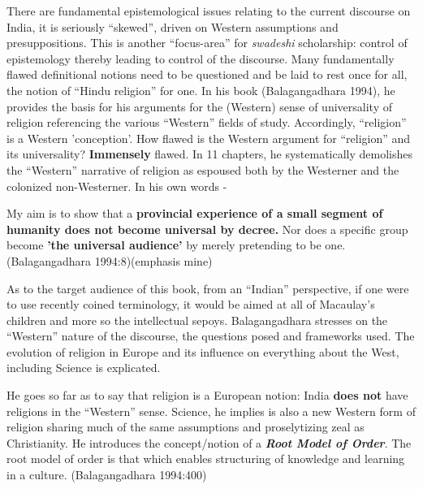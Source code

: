 There are fundamental epistemological issues relating to the current discourse on India, it is seriously “skewed”, driven on Western assumptions and presuppositions. This is another “focus-area” for \textit{swadeshi} scholarship: control of epistemology thereby leading to control of the discourse. Many fundamentally flawed definitional notions need to be questioned and be laid to rest once for all, the notion of “Hindu religion” for one. In his book (Balagangadhara 1994), he provides the basis for his arguments for the (Western) sense of universality of religion referencing the various “Western” fields of study. Accordingly, “religion” is a Western 'conception'. How flawed is the Western argument for “religion” and its universality? \textbf{Immensely} flawed. In 11 chapters, he systematically demolishes the “Western” narrative of religion as espoused both by the Westerner and the colonized non-Westerner. In his own words -

\begin{myquote}
My aim is to show that a \textbf{provincial experience of a small segment of humanity does not become universal by decree.} Nor does a specific group become \textbf{'the universal audience'} by merely pretending to be one. \hfill (Balagangadhara 1994:8)(emphasis mine)
\end{myquote}

As to the target audience of this book, from an “Indian” perspective, if one were to use recently coined terminology, it would be aimed at all of Macaulay's children and more so the intellectual sepoys. Balagangadhara stresses on the “Western” nature of the discourse, the questions posed and frameworks used. The evolution of religion in Europe and its influence on everything about the West, including Science is explicated.

He goes so far as to say that religion is a European notion: India \textbf{does not} have religions in the “Western” sense. Science, he implies is also a new Western form of religion sharing much of the same assumptions and proselytizing zeal as Christianity. He introduces the concept/notion of a \textbf{\textit{Root Model of Order}}. The root model of order is that which enables structuring of knowledge and learning in a culture. (Balagangadhara 1994:400)

